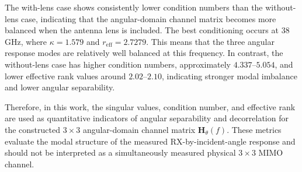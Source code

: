 \documentclass[10pt]{article}
\begin{document}
\begin{table}[H]
    \centering
    \caption{SVD evaluation of the \(3\times3\) angular-domain channel matrix \(\mathbf{H}_{\theta}(f)\).}
    \label{tab:svd_results}
    \footnotesize
    \setlength{\tabcolsep}{4pt}
\end{table}

The with-lens case shows consistently lower condition numbers than the without-lens case, indicating
that the angular-domain channel matrix becomes more balanced when the antenna lens is included. The
best conditioning occurs at 38 GHz, where \(\kappa=1.579\) and \(r_{\mathrm{eff}}=2.7279\). This
means that the three angular response modes are relatively well balanced at this frequency. In
contrast, the without-lens case has higher condition numbers, approximately \(4.337\)--\(5.054\), and
lower effective rank values around \(2.02\)--\(2.10\), indicating stronger modal imbalance and lower
angular separability.

Therefore, in this work, the singular values, condition number, and effective rank are used as
quantitative indicators of angular separability and decorrelation for the constructed
\(3\times3\) angular-domain channel matrix \(\mathbf{H}_{\theta}(f)\). These metrics evaluate the
modal structure of the measured RX-by-incident-angle response and should not be interpreted as a
simultaneously measured physical \(3\times3\) MIMO channel.
\end{document}
